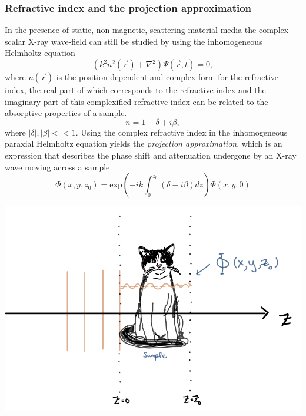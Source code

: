\documentclass[9pt, a4paper]{article}
\newenvironment{Figure}
    {\par\medskip\noindent\minipage{\linewidth}}
    {\endminipage\par\medskip}
\begin{document}
\subsubsection{Refractive index and the projection approximation}
In the presence of static, non-magnetic, scattering material media the complex scalar X-ray wave-field can still be studied by using the inhomogeneous Helmholtz equation 
\begin{equation}\label{eq:10}
\left ( k^2 n^2 (\vec{r}) + \nabla^{2}  \right )\Psi(\vec{r},t) = 0,
\end{equation}
where $n(\vec{r})$ is the position dependent and complex form for the refractive index, the real part of which corresponds to the refractive index and the imaginary part of this complexified refractive index can be related to the absorptive properties of a sample\cite{PagsTutes}.
\begin{equation}\label{eq:11}
n = 1 - \delta + i \beta,
\end{equation}
where $|\delta|, |\beta| << 1$. Using the complex refractive index in the inhomogeneous paraxial Helmholtz equation yields the \textit{projection approximation}, which is an expression that describes the phase shift and attenuation undergone by an X-ray wave moving across a sample
\begin{equation}\label{eq:12}
\Phi(x, y, z_0) = \mathrm{exp} \left ( -ik \int_{0}^{z_0}(\delta - i\beta)dz\right ) \Phi(x, y, 0)
\end{equation}

 \begin{Figure}
 \centering
 \includegraphics[width=0.6\linewidth]{projection_approximation.png}
\end{Figure}
\end{document}
